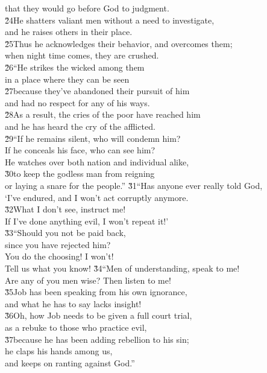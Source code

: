 \begin{poetry}
\poemll    that they would go before God to judgment. \\
\poeml \v{24}He shatters valiant men without a need to investigate, \\
\poemll    and he raises others in their place. \\
\poeml \v{25}Thus he acknowledges their behavior, and overcomes them; \\
\poemll    when night time comes, they are crushed. \\
\poeml \v{26}``He strikes the wicked among them \\
\poemll    in a place where they can be seen \\
\poeml \v{27}because they've abandoned their pursuit of him \\
\poemll    and had no respect for any of his ways. \\
\poeml \v{28}As a result, the cries of the poor have reached him \\
\poemll    and he has heard the cry of the afflicted. \\
\poeml \v{29}``If he remains silent, who will condemn him? \\
\poemll    If he conceals his face, who can see him? \\
\poemlll       He watches over both nation and individual alike, \\
\poeml \v{30}to keep the godless man from reigning \\
\poemll    or laying a snare for the people.''
\poeml \v{31}``Has anyone ever really told God, \\
\poemll    `I've endured, and I won't act corruptly anymore. \\
\poeml \v{32}What I don't see, instruct me! \\
\poemll    If I've done anything evil, I won't repeat it!' \\
\poeml \v{33}``Should you not be paid back, \\
\poemll    since you have rejected him? \\
\poeml You do the choosing! I won't! \\
\poemll    Tell us what you know!
\poeml \v{34}``Men of understanding, speak to me! \\
\poemll    Are any of you men wise? Then listen to me! \\
\poeml \v{35}Job has been speaking from his own ignorance, \\
\poemll    and what he has to say lacks insight! \\
\poeml \v{36}Oh, how Job needs to be given a full court trial, \\
\poemll    as a rebuke to those who practice evil, \\
\poeml \v{37}because he has been adding rebellion to his sin; \\
\poemll    he claps his hands among us, \\
\poemlll       and keeps on ranting against God.''
\end{poetry}

